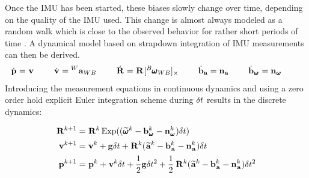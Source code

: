 Once the IMU has been started, these biases slowly change over time, depending on the quality of the IMU used. This change is almost always modeled 
as a random walk which is close to the observed behavior for rather short periods of time \cite{hussen2015low}.
A dynamical model based on strapdown integration of IMU measurements can then be derived.
%
\begin{equation}
    \begin{split}
    \dot{\prescript{}{}{{\bf p}}_{}} = \prescript{}{}{{\bf v}}_{}  ~~~~~~~
    \dot{\prescript{}{}{{\bf v}}_{}} = \prescript{W}{}{{\bf a}}_{WB} ~~~~~~~
    \dot{\prescript{}{}{{\bf R}}_{}} = \prescript{}{}{{\bf R}}_{} [\prescript{B}{}{\pmb{\omega}}_{WB}]_{\times} ~~~~~~~
    \dot{{\bf b}}_{{\bf a}} = {\bf n}_{{\bf a}}  ~~~~~~~
    \dot{{\bf b}}_{\prescript{}{}{\pmb{\omega}}_{}} = {\bf n}_{\prescript{}{}{\pmb{\omega}}_{}} ~~~~~~~
    \end{split}
    \label{eq:imu_dyn_conti}
\end{equation}
%
Introducing the measurement equations  in continuous dynamics  and using a zero order hold
explicit Euler integration scheme during $\delta t$ results in the discrete dynamics:

\begin{equation}
    \begin{split}
    \prescript{}{}{{\bf R}}_{}^{k+1}  &= \prescript{}{}{{\bf R}}_{}^{k}\operatorname*{Exp}((\prescript{}{}{\widetilde{\pmb{\omega}}}_{}^k - {\bf b}_{\prescript{}{}{\pmb{\omega}}_{}}^k - {\bf n}_{\prescript{}{}{\pmb{\omega}}_{}}^k)\delta t)
    \\
    \prescript{}{}{{\bf v}}_{}^{k+1}  &= \prescript{}{}{{\bf v}}_{}^{k} + {\bf g} \delta t + \prescript{}{}{{\bf R}}_{}^{k}(\prescript{}{}{\widetilde{{\bf a}}}_{}^k - {\bf b}_{\prescript{}{}{{\bf a}}_{}}^k - {\bf n}_{\prescript{}{}{{\bf a}}_{}}^k)\delta t
    \\
    \prescript{}{}{{\bf p}}_{}^{k+1} &= \prescript{}{}{{\bf p}}_{}^{k} + \prescript{}{}{{\bf v}}_{}^{k}\delta t + \frac{1}{2}{\bf g} \delta t^2 
    + \frac{1}{2}\prescript{}{}{{\bf R}}_{}^{k}(\prescript{}{}{\widetilde{{\bf a}}}_{}^k - {\bf b}_{\prescript{}{}{{\bf a}}_{}}^k - {\bf n}_{\prescript{}{}{{\bf a}}_{}}^k)\delta t^2
    \end{split}
    \label{eq:imu_dyn_disc}
\end{equation}
    
